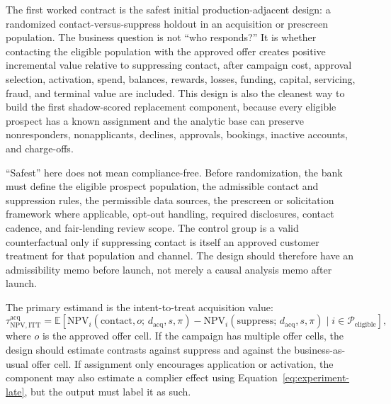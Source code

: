 \documentclass[11pt]{article}
\newcommand{\E}{\mathbb{E}}
\newcommand{\NPV}{\mathrm{NPV}}
\newcommand{\1}{\mathbf{1}}
\begin{document}
The first worked contract is the safest initial production-adjacent design:
a randomized contact-versus-suppress holdout in an acquisition or prescreen
population. The business question is not ``who responds?'' It is whether
contacting the eligible population with the approved offer creates positive
incremental value relative to suppressing contact, after campaign cost,
approval selection, activation, spend, balances, rewards, losses, funding,
capital, servicing, fraud, and terminal value are included. This design is
also the cleanest way to build the first shadow-scored replacement component,
because every eligible prospect has a known assignment and the analytic base
can preserve nonresponders, nonapplicants, declines, approvals, bookings,
inactive accounts, and charge-offs.

``Safest'' here does not mean compliance-free. Before randomization, the bank
must define the eligible prospect population, the admissible contact and
suppression rules, the permissible data sources, the prescreen or solicitation
framework where applicable, opt-out handling, required disclosures, contact
cadence, and fair-lending review scope. The control group is a valid
counterfactual only if suppressing contact is itself an approved customer
treatment for that population and channel. The design should therefore have an
admissibility memo before launch, not merely a causal analysis memo after
launch.

The primary estimand is the intent-to-treat acquisition value:
\begin{equation}
  \tau^{\mathrm{acq}}_{\NPV,\mathrm{ITT}}
  =
  \E[
    \NPV_i(\mathrm{contact},o;\,d_{\mathrm{acq}},s,\pi)
    -
    \NPV_i(\mathrm{suppress};\,d_{\mathrm{acq}},s,\pi)
    \mid i\in\mathcal{P}_{\mathrm{eligible}}
  ],
  \label{eq:worked-acq-itt}
\end{equation}
where $o$ is the approved offer cell. If the campaign has multiple offer
cells, the design should estimate contrasts against suppress and against the
business-as-usual offer cell. If assignment only encourages application or
activation, the component may also estimate a complier effect using
Equation~\eqref{eq:experiment-late}, but the output must label it as such.
\end{document}
